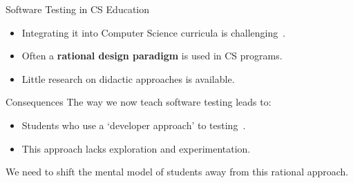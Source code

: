 \documentclass[aspectratio=169]{beamer}
\begin{document}
\begin{frame}{Software Testing in CS Education}
\begin{itemize}
    \item Integrating it into Computer Science curricula is challenging~\cite{garousi2020software, scatalon2020teaching}.
    \item Often a \textbf{rational design paradigm} is used in CS programs.
    \item Little research on didactic approaches is available.%
\end{itemize}
\end{frame}

\begin{frame}{Consequences}
    The way we now teach software testing leads to:
    \begin{itemize}
        \item Students who use a `developer approach' to testing~\cite{doorn2023towards}.
        \item This approach lacks exploration and experimentation.
    \end{itemize}
    \vspace{1cm}
    We need to shift the mental model of students away from this rational approach.
\end{frame}

\end{document}
